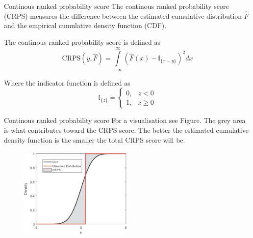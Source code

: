 \begin{frame}{Continous ranked probability score}
The continous ranked probability score (CRPS) measures the difference between the estimated cumulative distribution $\hat{F}$ and the empirical cumulative density function (CDF).
\begin{definition}\label{def_crps}
    The continous ranked probability score is defined as
    $$
    \mathrm{CRPS}(y, \hat{F})=\int\limits_{-\infty}^{\infty}\left(\hat{F}(x)-\mathbb{I}_{\{x-y\}} \right)^2 dx
    $$
\end{definition}
Where the indicator function is defined as 
    $$\mathbb{I}_{\{z\}}=
\begin{cases}
0, & z<0\\
1, & z \geq 0
\end{cases}$$
\end{frame}


\begin{frame}{Continous ranked probability score}
    For a visualisation see Figure. The grey area is what contributes toward the CRPS score.
    The better the estimated cumulative density function is the smaller the total CRPS score will be.
    \begin{figure}
        \includegraphics[width=0.5\textwidth]{../thesis/images/crps.png}
    \end{figure}
\end{frame}